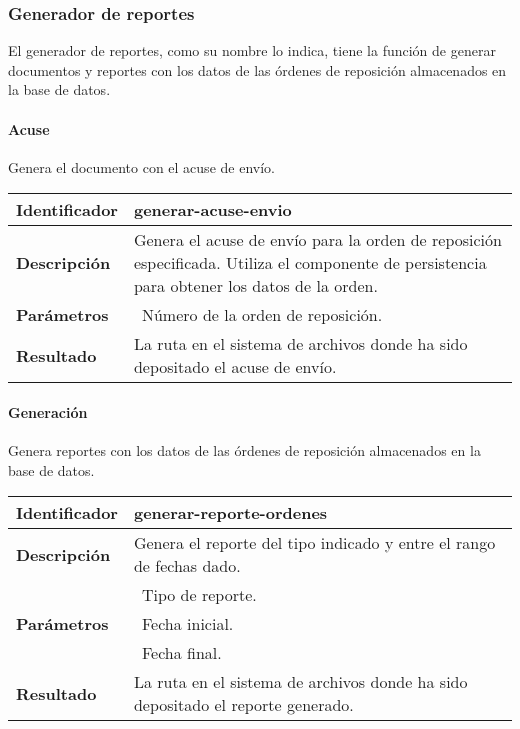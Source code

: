 \subsubsection{Generador de reportes}
El generador de reportes, como su nombre lo indica, tiene la función de generar documentos y reportes con los datos de las órdenes de reposición almacenados en la base de datos. 
\paragraph{Acuse\\} Genera el documento con el acuse de envío.
	\vspace{5mm}\\
	\begin{tabular}{|p{}|p{}|}
		\hline
		\textbf{Identificador}	& \textbf{generar-acuse-envio}\\
		\hline
		\hline
		\textbf{Descripción}	& Genera el acuse de envío para la orden de reposición especificada. Utiliza el componente de persistencia para obtener los datos de la orden.\\
		\hline
		\textbf{Parámetros}		& \textbullet\, Número de la orden de reposición.\\
		\hline
		\textbf{Resultado}		& La ruta en el sistema de archivos donde ha sido depositado el acuse de envío.\\
		\hline
	\end{tabular}
	\vspace{5mm}

\paragraph{Generación\\} Genera reportes con los datos de las órdenes de reposición almacenados en la base de datos.
	\vspace{5mm}\\
	\begin{tabular}{|p{}|p{}|}
		\hline
		\textbf{Identificador}	& \textbf{generar-reporte-ordenes}\\
		\hline
		\hline
		\textbf{Descripción}	& Genera el reporte del tipo indicado y entre el rango de fechas dado.\\
		\hline
		\multirow{3}{*}{\textbf{Parámetros}}	& \textbullet\, Tipo de reporte.\\
												& \textbullet\, Fecha inicial.\\
												& \textbullet\, Fecha final.\\
		\hline
		\textbf{Resultado}		& La ruta en el sistema de archivos donde ha sido depositado el reporte generado.\\
		\hline
	\end{tabular}
	\vspace{5mm}

